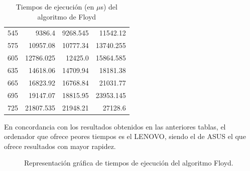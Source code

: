 \documentclass{homework}
\begin{document}
\begin{table}[h]
\begin{tabular}{|r|r|r|r|}
            545 & 9386.4 & 9268.545 & 11542.12 \\ 
            575 & 10957.08 & 10777.34 & 13740.255 \\ 
            605 & 12786.025 & 12425.0 & 15864.585 \\ 
            635 & 14618.06 & 14709.94 & 18181.38 \\ 
            665 & 16823.92 & 16768.84 & 21031.77 \\ 
            695 & 19147.07 & 18815.95 & 23953.145 \\ 
            725 & 21807.535 & 21948.21 & 27128.6 \\ 
            \hline
        \end{tabular}
        \caption{Tiempos de ejecución (en $\mu$s) del algoritmo de Floyd}
    \end{table}

    En concordancia con los resultados obtenidos en las anteriores tablas, el ordenador que ofrece peores
    tiempos es el LENOVO, siendo el de ASUS el que ofrece resultados con mayor rapidez. 

    \begin{figure}[h]
        \centering
        \caption{Representación gráfica de tiempos de ejecución del algoritmo Floyd.}
        \label{emp:floyd}
       \end{figure}
\end{document}
